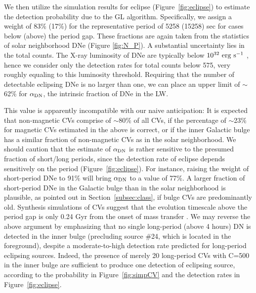 \documentclass[fleqn,usenatbib]{mnras}
\begin{document}
We then utilize the simulation results for eclipse (Figure~\ref{fig:eclipse}) to estimate the detection probability due to the GL algorithm. Specifically, we assign a weight of 83\% (17\%) for the representative period of 5258 (15258) sec for cases below (above) the period gap. These fractions are again taken from the statistics of solar neighborhood DNe (Figure \ref{fig:N_P}). 
A substantial uncertainty lies in the total counts. The X-ray luminosity of DNe are typically below $\rm 10^{32}~erg~s^{-1}$ \citep{2016ApJ...818..136X}, hence we consider only the detection rates for total counts below 575, very roughly equaling to this luminosity threshold.
Requiring that the number of detectable eclipsing DNe is no larger than one,  
we can place an upper limit of $\sim$62\% for $\alpha_{\rm DN}$, the intrinsic fraction of DNe in the LW. 

This value is apparently incompatible with our naive anticipation: It is expected that non-magnetic CVs comprise of $\sim$80\% of all CVs, if the percentage of $\sim$23\% for magnetic CVs estimated in the above is correct, or if the inner Galactic bulge has a similar fraction of non-magnetic CVs as in the solar neighborhood.  
We should caution that the estimate of $\alpha_{\rm DN}$ is rather sensitive to the presumed fraction of short/long periods, since the detection rate of eclipse depends sensitively on the period (Figure~\ref{fig:eclipse}). 
For instance, raising the weight of short-period DNe to 91\% will bring $\alpha_{\rm DN}$ to a value of 77\%.
A larger fraction of short-period DNe in the Galactic bulge than in the solar neighborhood is plausible, as pointed out in Section~\ref{subsec:class}, if bulge CVs are predominantly old. 
Synthesis simulations of CVs suggest that the evolution timescale above the period gap is only 0.24 Gyr from the onset of mass transfer \citep{2011ApJS..194...28K}.
We may reverse the above argument by emphasizing that no single long-period (above 4 hours) DN is detected in the inner bulge (precluding source \#24, which is located in the foreground), despite a moderate-to-high detection rate predicted for long-period eclipsing sources. 
Indeed, the presence of merely 20 long-period CVs with C=500 in the inner bulge are sufficient to produce one detection of eclipsing source, according to the probability in Figure~\ref{fig:simpCV} and the detection rates in Figure~\ref{fig:eclipse}.  
\end{document}
